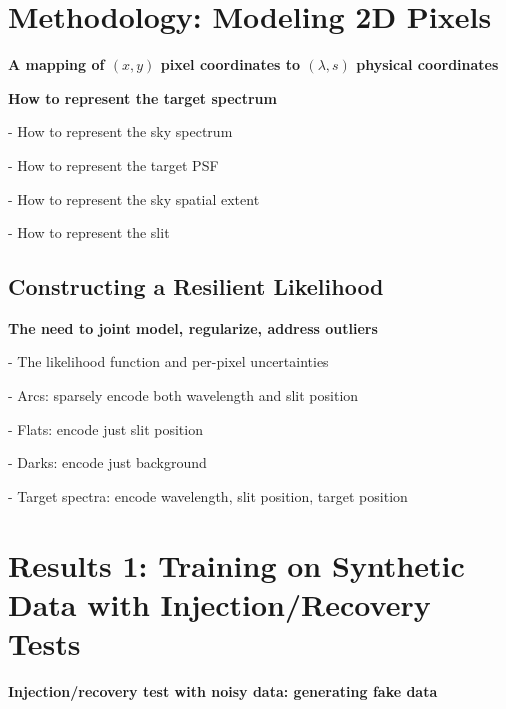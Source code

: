\documentclass[twocolumn]{aastex63}
\begin{document}
\section{Methodology: Modeling 2D Pixels}

\begin{mdframed}
  \textbf{A mapping of $(x, y)$ pixel coordinates to $(\lambda, s)$ physical coordinates} \par
  \textcolor{lightgray}{\lipsum[7]}
\end{mdframed}

\begin{mdframed}
  \textbf{How to represent the target spectrum} \par
  - How to represent the sky spectrum\par
  - How to represent the target PSF\par
  - How to represent the sky spatial extent\par
  - How to represent the slit\par
\end{mdframed}


\subsection{Constructing a Resilient Likelihood}
\begin{mdframed}
  \textbf{The need to joint model, regularize, address outliers} \par
  - The likelihood function and per-pixel uncertainties\par
  - Arcs: sparsely encode both wavelength and slit position\par
  - Flats: encode just slit position\par
  - Darks: encode just background\par
  - Target spectra: encode wavelength, slit position, target position\par
  \textcolor{lightgray}{\lipsum[7]}
\end{mdframed}


\section{Results 1: Training on Synthetic Data with Injection/Recovery Tests}

\begin{mdframed}
  \textbf{Injection/recovery test with noisy data: generating fake data} \par
  \textcolor{lightgray}{\lipsum[9]}
\end{mdframed}
\end{document}
